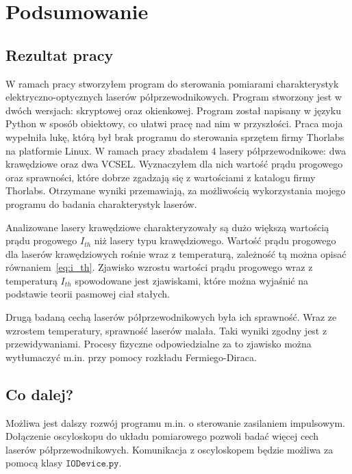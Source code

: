 \chapter{Podsumowanie}
\section{Rezultat pracy}
W ramach pracy stworzyłem program do sterowania pomiarami charakterystyk elektryczno-optycznych laserów półprzewodnikowych.
Program stworzony jest
w dwóch wersjach: skryptowej oraz okienkowej. Program został napisany w języku Python w sposób obiektowy, co ułatwi
pracę nad nim w przyszłości. Praca moja wypełniła lukę, którą był brak programu do sterowania sprzętem firmy Thorlabs
na platformie Linux. W ramach pracy zbadałem 4 lasery półprzewodnikowe: dwa krawędziowe oraz dwa VCSEL. Wyznaczyłem dla nich
wartość prądu progowego oraz sprawności, które dobrze zgadzają się z wartościami z katalogu firmy Thorlabs. Otrzymane wyniki
przemawiają, za możliwością wykorzystania mojego programu do badania charakterystyk laserów.

Analizowane lasery krawędziowe charakteryzowały są dużo większą wartością prądu progowego $I_{th}$ niż lasery typu krawędziowego.
Wartość prądu progowego dla laserów krawędziowych rośnie wraz z temperaturą, zależność tą można opisać równaniem~\ref{eq:i_th}.
Zjawisko wzrostu wartości prądu progowego wraz z temperaturą $I_{th}$
spowodowane jest zjawiskami, które można wyjaśnić na podstawie teorii pasmowej ciał stałych.

Drugą badaną cechą laserów półprzewodnikowych była ich sprawność. Wraz ze wzrostem temperatury, sprawność laserów malała.
Taki wyniki zgodny jest z przewidywaniami. Procesy fizyczne odpowiedzialne za to zjawisko można wytłumaczyć m.in. przy pomocy rozkładu Fermiego-Diraca.
\section{Co dalej?}
Możliwa jest dalszy rozwój programu m.in. o sterowanie zasilaniem impulsowym. Dołączenie oscyloskopu do układu pomiarowego pozwoli badać więcej cech
laserów półprzewodnikowych. Komunikacja z oscyloskopem będzie możliwa za pomocą klasy $\mathtt{IODevice.py}$.
